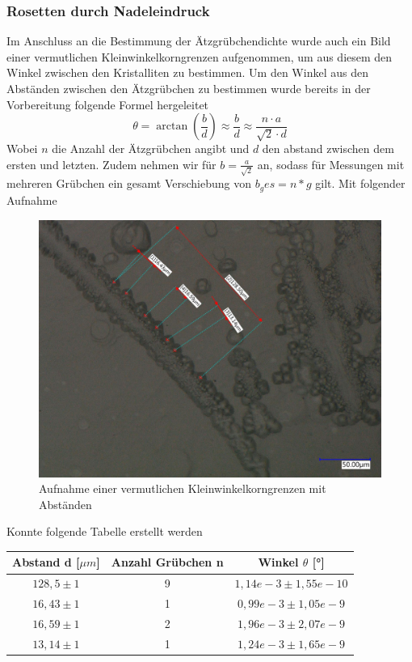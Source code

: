         \subsubsection*{Rosetten durch Nadeleindruck}
            Im Anschluss an die Bestimmung der Ätzgrübchendichte wurde auch ein Bild einer vermutlichen Kleinwinkelkorngrenzen aufgenommen, um aus diesem
            den Winkel zwischen den Kristalliten zu bestimmen. Um den Winkel aus den Abständen zwischen den Ätzgrübchen zu bestimmen wurde bereits in der Vorbereitung
            folgende Formel hergeleitet
            \begin{equation}
                \theta = \arctan(\frac{b}{d}) \approx \frac{b}{d} \approx \frac{n\cdot a}{\sqrt{2}\cdot d}
            \end{equation}
            Wobei $n$ die Anzahl der Ätzgrübchen angibt und $d$ den abstand zwischen dem ersten und letzten. Zudem nehmen wir für $b=\frac{a}{\sqrt{2}}$ an, sodass für
            Messungen mit mehreren Grübchen ein gesamt Verschiebung von $b_ges = n * g$ gilt.
            Mit folgender Aufnahme
            \begin{figure}[H]
                \centering
                \includegraphics[width=\textwidth]{Images/kleinwinkelkorngrenze 2.jpg}
                \caption{Aufnahme einer vermutlichen Kleinwinkelkorngrenzen mit Abständen}
            \end{figure}
            Konnte folgende Tabelle erstellt werden
            \begin{table}[H]
                \centering
                \begin{tabular}[]{c|c|c}
                    Abstand d [$\mu m$] & Anzahl Grübchen n & Winkel $\theta$ [°] \\
                    \hline
                    $128,5 \pm 1$ & 9 & $1,14e-3 \pm 1,55e-10$\\
                    $16,43 \pm 1$ & 1 & $0,99e-3 \pm 1,05e-9$\\
                    $16,59 \pm 1$ & 2 & $1,96e-3 \pm 2,07e-9$\\
                    $13,14 \pm 1$ & 1 & $1,24e-3 \pm 1,65e-9$\\   
                \end{tabular}
            \end{table}
